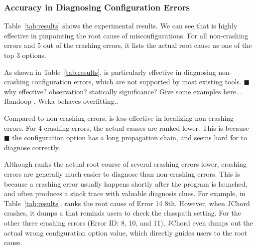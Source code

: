 \begin{table*}[t]
\end{table*}


\subsubsection{Accuracy in Diagnosing Configuration Errors}

Table~\ref{tab:results} shows the experimental results.
We can see that \ourtool is highly effective in pinpointing the root cause of
misconfigurations. For all \noncrash non-crashing errors
and 5 out of the \crash crashing errors, it lists the actual root cause as one of the
top 3 options. 


As shown in Table~\ref{tab:results}, \ourtool is particularly effective
in diagnosing non-crashing configuration errors, which are not supported
by most existing tools. $\blacksquare$ why effective? observation?
statically significance? Give some examples here... Randoop ,
Weka behaves overfitting..


Compared to non-crashing errors, \ourtool is less effective
in localizing non-crashing errors. For 4 crashing errors,
the actual causes are ranked lower.
This is because $\blacksquare$ the configuration option has
a long propagation chain, and seems hard for \ourtool
to diagnose correctly.

Although \ourtool ranks the actual root course of several
crashing errors lower, crashing errors are generally much easier to diagnose than non-crashing errors.
This is because a crashing error usually happens shortly after the program
is launched, and often produces a stack trace with valuable diagnosis clues.
For example, in Table~\ref{tab:results}, \ourtool ranks the root cause of
Error 14  8th.
However, when JChord crashes, it dumps a 
that reminds users to check the classpath setting. For the other three crashing errors (Error ID: 8, 10, and 11),
JChord even dumps out the actual wrong configuration option value, which
directly guides users to the root cause.

